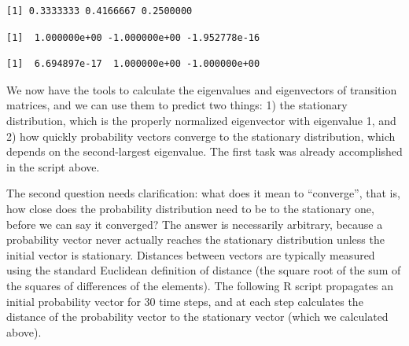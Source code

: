\documentclass[
  letterpaper,
  DIV=11,
  numbers=noendperiod]{scrreprt}
\newenvironment{Shaded}{\begin{snugshade}}{\end{snugshade}}
\newcommand{\DecValTok}[1]{\textcolor[rgb]{0.68,0.00,0.00}{#1}}
\newcommand{\FunctionTok}[1]{\textcolor[rgb]{0.28,0.35,0.67}{#1}}
\newcommand{\NormalTok}[1]{\textcolor[rgb]{0.00,0.23,0.31}{#1}}
\newcommand{\OtherTok}[1]{\textcolor[rgb]{0.00,0.23,0.31}{#1}}
\newcommand{\SpecialCharTok}[1]{\textcolor[rgb]{0.37,0.37,0.37}{#1}}
\begin{document}
\begin{verbatim}
[1] 0.3333333 0.4166667 0.2500000
\end{verbatim}

\begin{Shaded}
\end{Shaded}

\begin{verbatim}
[1]  1.000000e+00 -1.000000e+00 -1.952778e-16
\end{verbatim}

\begin{Shaded}
\end{Shaded}

\begin{verbatim}
[1]  6.694897e-17  1.000000e+00 -1.000000e+00
\end{verbatim}

We now have the tools to calculate the eigenvalues and eigenvectors of
transition matrices, and we can use them to predict two things: 1) the
stationary distribution, which is the properly normalized eigenvector
with eigenvalue 1, and 2) how quickly probability vectors converge to
the stationary distribution, which depends on the second-largest
eigenvalue. The first task was already accomplished in the script above.

The second question needs clarification: what does it mean to
``converge'', that is, how close does the probability distribution need
to be to the stationary one, before we can say it converged? The answer
is necessarily arbitrary, because a probability vector never actually
reaches the stationary distribution unless the initial vector is
stationary. Distances between vectors are typically measured using the
standard Euclidean definition of distance (the square root of the sum of
the squares of differences of the elements). The following R script
propagates an initial probability vector for 30 time steps, and at each
step calculates the distance of the probability vector to the stationary
vector (which we calculated above).
\end{document}

